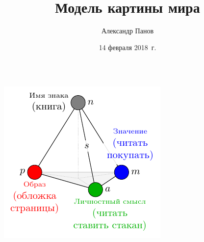 \documentclass[default]{beamer}
\begin{document}
	
	\title[Модель картины мира]{Модель картины мира}
	\author[Панов]{Александр Панов}
	\date{14 февраля 2018~г.} 
	
	\begin{frame}
		\titlepage
	\end{frame}
		
	\begin{frame}
		\tiny
		\begin{columns}
			\begin{column}{0.6\textwidth}
				
				\begin{columns}
					\begin{column}{0.4\textwidth}
						\begin{center}
							\includegraphics[width=\textwidth]{signs/ru/sign_color_book_ru}
						\end{center}
						

\end{column}
\end{columns}
\end{column}
\end{columns}
\end{frame}
\end{document}
